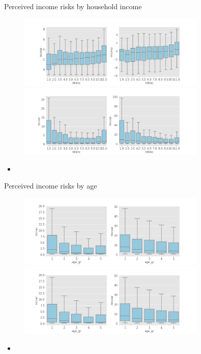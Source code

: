 \documentclass{beamer}
\begin{document}
\begin{frame}{Perceived income risks by household income}
	\begin{figure}
		\centering
		\label{boxplot_hhinc}
		\includegraphics[width=0.8\textwidth]{figures/boxplot_exp_HHinc} \\
		\includegraphics[width=0.8\textwidth]{figures/boxplot_var_HHinc}
	\end{figure}
	\begin{itemize}
		\item 
	\end{itemize}
\end{frame}


\begin{frame}{Perceived income risks by age}
	\begin{figure}
		\centering
		\label{boxplot_age_gr}
		\includegraphics[width=0.8\textwidth]{figures/boxplot_exp_age_gr} \\
		\includegraphics[width=0.8\textwidth]{figures/boxplot_var_age_gr}
	\end{figure}
	\begin{itemize}
		\item 
	\end{itemize}
\end{frame}
\end{document}
